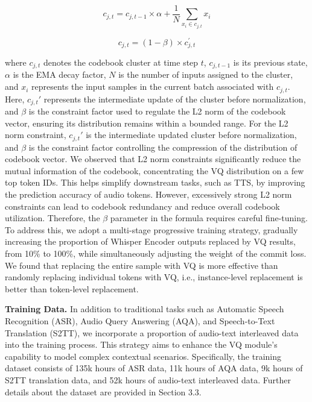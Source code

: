 \begin{equation}
  c_{j, t} = c_{j, t-1} \times \alpha + \frac{1}{N} \sum_{x_{i} \in c_{j,t}} x_{i}
  \label{eq:formula1}
\end{equation}

\begin{equation}
  c_{j,t} = (1 - \beta) \times c_{j, t}^{\prime}
  \label{eq:formula2}
\end{equation}

where \( c_{j, t} \) denotes the codebook cluster at time step \( t \), \( c_{j, t-1} \) is its previous state, \( \alpha \) is the EMA decay factor, \( N \) is the number of inputs assigned to the cluster, and \( x_i \) represents the input samples in the current batch associated with \( c_{j, t} \). Here, \( c_{j, t}' \) represents the intermediate update of the cluster before normalization, and \( \beta \) is the constraint factor used to regulate the L2 norm of the codebook vector, ensuring its distribution remains within a bounded range. For the L2 norm constraint, \( c_{j, t}' \) is the intermediate updated cluster before normalization, and \( \beta \) is the constraint factor controlling the compression of the distribution of codebook vector. We observed that L2 norm constraints significantly reduce the mutual information of the codebook, concentrating the VQ distribution on a few top token IDs. This helps simplify downstream tasks, such as TTS, by improving the prediction accuracy of audio tokens. However, excessively strong L2 norm constraints can lead to codebook redundancy and reduce overall codebook utilization. Therefore, the $\beta$ parameter in the formula requires careful fine-tuning. To address this, we adopt a multi-stage progressive training strategy, gradually increasing the proportion of Whisper Encoder outputs replaced by VQ results, from 10\% to 100\%, while simultaneously adjusting the weight of the commit loss. We found that replacing the entire sample with VQ is more effective than randomly replacing individual tokens with VQ, i.e., instance-level replacement is better than token-level replacement.


\textbf{Training Data.}
In addition to traditional tasks such as Automatic Speech Recognition (ASR), Audio Query Answering (AQA), and Speech-to-Text Translation (S2TT), we incorporate a proportion of audio-text interleaved data into the training process. This strategy aims to enhance the VQ module's capability to model complex contextual scenarios. Specifically, the training dataset consists of 135k hours of ASR data, 11k hours of AQA data, 9k hours of S2TT translation data, and 52k hours of audio-text interleaved data. Further details about the dataset are provided in Section 3.3.

